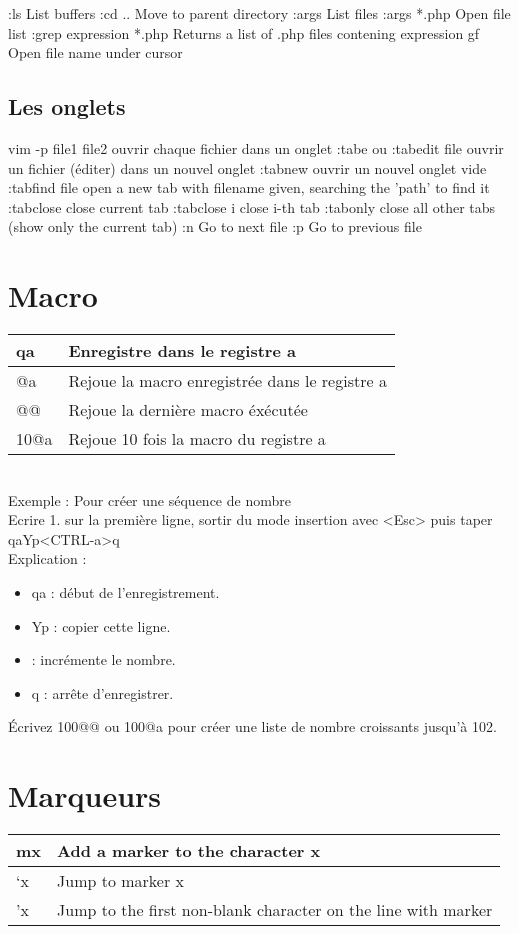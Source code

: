 \documentclass{article}
\begin{document}
:ls List buffers
:cd .. Move to parent directory
:args List files
:args *.php Open file list
:grep expression *.php Returns a list of .php files contening expression
gf Open file name under cursor
\subsection{Les onglets}
vim -p file1 file2 ouvrir chaque fichier dans un onglet
:tabe ou :tabedit {file} ouvrir un fichier (éditer) dans un nouvel onglet
:tabnew ouvrir un nouvel onglet vide
:tabfind {file} open a new tab with filename given, searching the 'path' to find it
:tabclose close current tab
:tabclose {i} close i-th tab
:tabonly close all other tabs (show only the current tab)
:n Go to next file
:p Go to previous file

\section{Macro}
\begin{tabular}{|p{3cm}| l| }\hline
qa & Enregistre dans le registre a \\ \hline
@a & Rejoue la macro enregistrée dans le registre a \\ \hline
@@ & Rejoue la dernière macro éxécutée \\ \hline
10@a & Rejoue 10 fois la macro du registre a \\ \hline
\end{tabular}\\


\noindent
Exemple : Pour créer une séquence de nombre\\
\noindent
Ecrire 1. sur la première ligne, sortir du mode insertion avec <Esc> puis taper qaYp<CTRL-a>q\\
Explication :
\begin{itemize}
\renewcommand{\labelitemi}{$\bullet$}
\item qa : début de l'enregistrement.
\item Yp : copier cette ligne.
\item <CTRL-a> : incrémente le nombre.
\item q : arrête d'enregistrer.
    \end{itemize}
    Écrivez 100@@ ou 100@a pour créer une liste de nombre croissants jusqu'à 102.
\section{Marqueurs}
\begin{tabular}{|p{3cm}| l| }
\hline
mx & Add a marker to the character x\\ \hline
`x & Jump to marker x\\ \hline
'x & Jump to the first non-blank character on the line with marker\\ \hline
\end{tabular}\\
\end{document}

